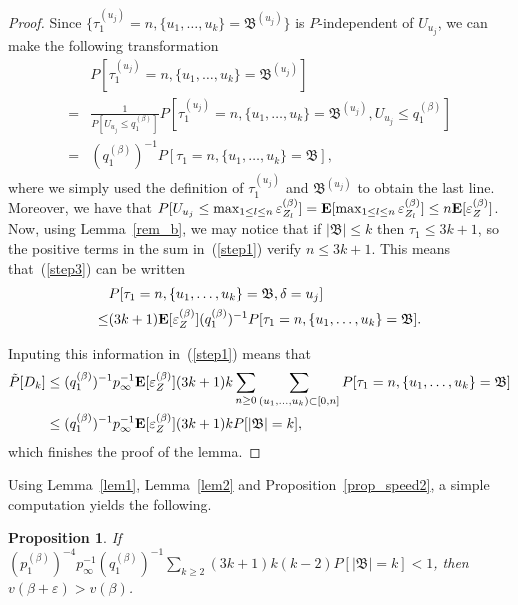 \documentclass[12pt]{amsart}
\numberwithin{equation}{section}
\newtheorem{proposition}{Proposition}[section]
\begin{document}
\begin{proof}
 Since $\{\tau_1^{(u_j)}=n, \{u_1,\ldots,u_k\}=\mathfrak{B}^{(u_j)}\}$ is $P$-independent of $U_{u_j}$, we can make the following transformation
 \begin{align*}
  &P[\tau_1^{(u_j)}=n, \{u_1,\ldots,u_k\}=\mathfrak{B}^{(u_j)}] \\
 =& \frac 1 {P[U_{u_j}\leq q_1^{(\beta)}]} P[\tau_1^{(u_j)}=n, \{u_1,\ldots,u_k\}=\mathfrak{B}^{(u_j)}, U_{u_j}\leq q_1^{(\beta)}] \\
 =&  (q_1^{(\beta)})^{-1} P[\tau_1=n, \{u_1,\ldots,u_k\}=\mathfrak{B}],
 \end{align*}
 where we simply used the definition of $\tau_1^{(u_j)}$ and $\mathfrak{B}^{(u_j)}$ to obtain the last line. Moreover, we have that $P[U_{u_j}\leq \max_{1\leq l\leq n}{\varepsilon}_{Z_{l}}^{(\beta)}]={\bf E}[\max_{1\leq l\leq n}{\varepsilon}_{Z_{l}}^{(\beta)}]\leq n {\bf E}[{\varepsilon}_Z^{(\beta)}]$. Now, using Lemma~\ref{rem_b}, we may notice that if ${\left\vert {\mathfrak{B}}\right\vert}\leq k$ then $\tau_1\leq 3k+1$, so the positive terms in the sum in~(\ref{step1}) verify $n\leq 3k+1$. This means that~(\ref{step3}) can be written
 \begin{align*}
 & P[\tau_1=n, \{u_1,\ldots,u_k\}=\mathfrak{B}, \delta=u_j]\\
 \leq & (3k+1){\bf E}[{\varepsilon}_Z^{(\beta)}]
  (q_1^{(\beta)})^{-1} P[\tau_1=n, \{u_1,\ldots,u_k\}=\mathfrak{B}].
  \end{align*}
  
  Inputing this information in~(\ref{step1}) means that
  \begin{align*}
  \tilde{P}[D_k] &\leq  (q_1^{(\beta)})^{-1}p_{\infty}^{-1} {\bf E}[{\varepsilon}_Z^{(\beta)}]
(3k+1)k  \sum_{n\geq 0} \sum_{ (u_1,\ldots,u_k) \subset [0,n]}  P[\tau_1=n, \{u_1,\ldots,u_k\}=\mathfrak{B}]\\
   &\leq  (q_1^{(\beta)})^{-1}p_{\infty}^{-1} {\bf E}[{\varepsilon}_Z^{(\beta)}](3k+1)k P[{\left\vert {\mathfrak{B}}\right\vert}=k],
   \end{align*}
   which finishes the proof of the lemma.
  \end{proof}
 
 Using Lemma~\ref{lem1}, Lemma~\ref{lem2} and Proposition~\ref{prop_speed2}, a simple computation yields the following.
 \begin{proposition}
 \label{prop_speed3}
 If  $(p_1^{(\beta)})^{-4} p_{\infty}^{-1} (q_1^{(\beta)})^{-1} \sum_{k\geq 2}(3k+1)k(k-2)P[{\left\vert {\mathfrak{B}}\right\vert}=k] <1$, then $v(\beta+{\varepsilon})>v(\beta)$.
 \end{proposition}
 
\end{document}
